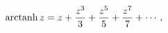 \[\mathop{\mathrm{arctanh}\/}\nolimits z=z+\frac{z^{3}}{3}+\frac{z^{5}}{5}+\frac%
{z^{7}}{7}+\cdots,\]